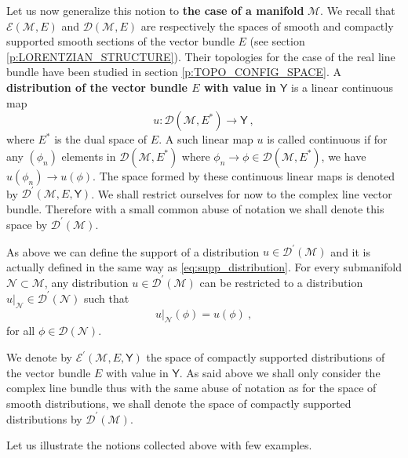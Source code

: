 \documentclass[11pt]{book}
\newcommand{\Dcal}{\mathcal{D}}
\newcommand{\Ecal}{\mathcal{E}}
\newcommand{\Mcal}{\mathcal{M}}
\newcommand{\Ncal}{\mathcal{N}}
\newcommand{\Ysf}{\mathsf{Y}}
\theoremstyle{break}
\begin{document}
\bigskip


Let us now generalize this notion to \textbf{the case of a manifold} $\Mcal$. We recall that $\Ecal(\Mcal,E)$ and $\Dcal(\Mcal,E)$ are respectively the spaces of smooth and compactly supported smooth sections of the vector bundle $E$ (see section \ref{p:LORENTZIAN_STRUCTURE}). Their topologies for the case of the real line bundle have been studied in section \ref{p:TOPO_CONFIG_SPACE}. A \textbf{distribution of the vector bundle $E$ with value in $\Ysf$} is a linear continuous map 
%
\begin{equation*}
u : \Dcal(\Mcal,E^\ast) \to \Ysf \ ,
\end{equation*}
%
where $E^\ast$ is the dual space of $E$. A such linear map $u$ is called continuous if for any $(\phi_n)$ elements in $\Dcal(\Mcal,E^\ast)$ where $\phi_n \to \phi \in \Dcal(\Mcal,E^\ast)$, we have $u(\phi_n) \to u(\phi)$. The space formed by these continuous linear maps is denoted by $\Dcal^\prime(\Mcal,E,\Ysf)$. We shall restrict ourselves for now to the complex line vector bundle. Therefore with a small common abuse of notation we shall denote this space by $\Dcal^\prime(\Mcal)$. 


As above we can define the support of a distribution $u \in \Dcal^\prime(\Mcal)$ and it is actually defined in the same way as \eqref{eq:supp_distribution}. For every submanifold $\Ncal \subset \Mcal$, any distribution $u \in \Dcal^\prime(\Mcal)$ can be restricted to a distribution $\left.u\right|_{\Ncal} \in \Dcal^\prime(\Ncal)$ such that
%
\begin{equation*}
\left.u\right|_{\Ncal}(\phi) = u(\phi) \ , 
\end{equation*}
%
for all $\phi \in \Dcal(\Ncal)$. 


We denote by $\Ecal^\prime(\Mcal,E,\Ysf)$ the space of compactly supported distributions of the vector bundle $E$ with value in $\Ysf$. As said above we shall only consider the complex line bundle thus with the same abuse of notation as for the space of smooth distributions, we shall denote the space of compactly supported distributions by $\Dcal^\prime(\Mcal)$.


\bigskip


Let us illustrate the notions collected above with few examples. 
\end{document}
